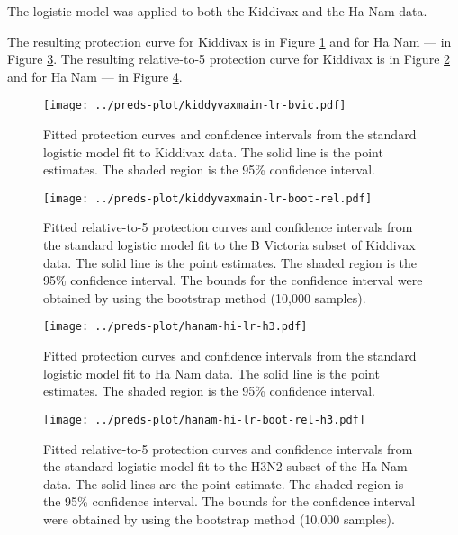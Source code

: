The logistic model was applied to both the Kiddivax and the Ha Nam data.

The resulting protection curve for Kiddivax is in Figure \ref{fig:kiddyvaxmain-prot-lr} and for Ha Nam --- in Figure \ref{fig:hanam-prot-lr}. The resulting relative-to-5 protection curve for Kiddivax is in Figure \ref{fig:kiddyvaxmain-prot-rel-lr-boot} and for Ha Nam --- in Figure \ref{fig:hanam-prot-rel-lr-boot}.

\begin{figure}[htp]
    \centering
    \texttt{[image: ../preds-plot/kiddyvaxmain-lr-bvic.pdf]}
    \caption{
        Fitted protection curves and confidence intervals from the standard logistic model fit to Kiddivax data. The solid line is the point estimates. The shaded region is the 95\% confidence interval.
    }
    \label{fig:kiddyvaxmain-prot-lr}
\end{figure}

\begin{figure}[htp]
    \centering
    \texttt{[image: ../preds-plot/kiddyvaxmain-lr-boot-rel.pdf]}
    \caption{
        Fitted relative-to-5 protection curves and confidence intervals from the standard logistic model fit to the B Victoria subset of Kiddivax data. The solid line is the point estimates. The shaded region is the 95\% confidence interval. The bounds for the confidence interval were obtained by using the bootstrap method (10,000 samples).
    }
    \label{fig:kiddyvaxmain-prot-rel-lr-boot}
\end{figure}

\begin{figure}[htp]
    \centering
    \texttt{[image: ../preds-plot/hanam-hi-lr-h3.pdf]}
    \caption{
        Fitted protection curves and confidence intervals from the standard logistic model fit to Ha Nam data. The solid line is the point estimates. The shaded region is the 95\% confidence interval.
    }
    \label{fig:hanam-prot-lr}
\end{figure}

\begin{figure}[htp]
    \centering
    \texttt{[image: ../preds-plot/hanam-hi-lr-boot-rel-h3.pdf]}
    \caption{
        Fitted relative-to-5 protection curves and confidence intervals from the standard logistic model fit to the H3N2 subset of the Ha Nam data. The solid lines are the point estimate. The shaded region is the 95\% confidence interval. The bounds for the confidence interval were obtained by using the bootstrap method (10,000 samples).
    }
    \label{fig:hanam-prot-rel-lr-boot}
\end{figure}

